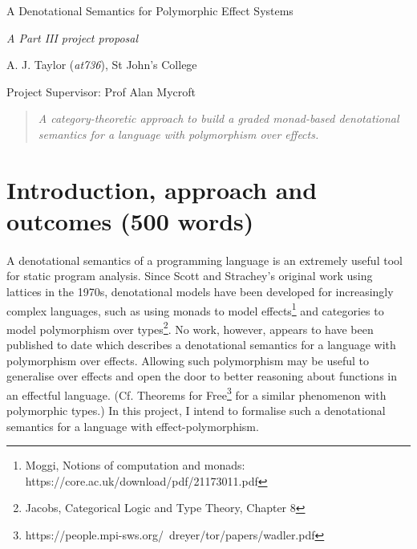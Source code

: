 \documentclass[11pt]{article}
\begin{document}
\centerline{\Large A Denotational Semantics for Polymorphic Effect Systems}
\vspace{2em}
\centerline{\Large \emph{A Part III project proposal}}
\vspace{2em}
\centerline{\large A. J. Taylor (\emph{at736}), St John's College}
\vspace{1em}
\centerline{\large Project Supervisor: Prof Alan Mycroft}
\vspace{1em}

\begin{abstract}
\textsl{
	A category-theoretic approach to build a graded monad-based denotational semantics for a language with polymorphism over effects.
} 
\end{abstract}

\section{Introduction, approach and outcomes (500 words)}
  
\paragraph{}{
A denotational semantics of a programming language is an extremely useful tool for static program analysis. Since Scott and Strachey's original work using lattices in the 1970s, denotational models have been developed for increasingly complex languages, such as using monads to model effects\footnote{Moggi, Notions of computation and monads: https://core.ac.uk/download/pdf/21173011.pdf} and categories to model polymorphism over types\footnote{ Jacobs, Categorical Logic and Type Theory, Chapter 8}. No work, however, appears to have been published to date which describes a denotational semantics for a language with polymorphism over effects. Allowing such polymorphism may be useful to generalise over effects and open the door to better reasoning about functions in an effectful language. (Cf. Theorems for Free\footnote{https://people.mpi-sws.org/~dreyer/tor/papers/wadler.pdf} for a similar phenomenon with polymorphic types.) In this project, I intend to formalise such a denotational semantics for a language with effect-polymorphism.}
\end{document}

